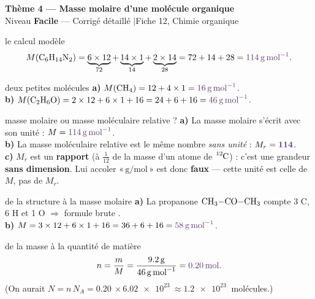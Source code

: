 \documentclass[11pt,a4paper]{article}
\newcommand{\rep}[1]{\textcolor{primarydark}{\textbf{#1}}}
\newcommand{\banner}[2]{%
\begin{tcolorbox}[enhanced,colback=excol,colframe=excol,arc=5pt,boxrule=0pt,
   left=5mm,right=5mm,top=2.5mm,bottom=2.5mm,coltext=white]
{\large\bfseries #1}\\[1pt]{\small #2}
\end{tcolorbox}\vspace{2pt}}
\begin{document}
\banner{Thème 4 — Masse molaire d'une molécule organique}{Niveau \textbf{Facile} — Corrigé détaillé \quad$\vert$\quad Fiche 12, Chimie organique}

\begin{corr}{le calcul modèle}
\[ M(\ce{C6H14N2}) = \underbrace{6\times12}_{72} + \underbrace{14\times1}_{14} + \underbrace{2\times14}_{28} = 72+14+28 = \rep{\qty{114}{\g\per\mol}}. \]
\end{corr}

\begin{corr}{deux petites molécules}
\textbf{a)} $M(\ce{CH4}) = 12 + 4\times1 = \rep{\qty{16}{\g\per\mol}}$.\\
\textbf{b)} $M(\ce{C2H6O}) = 2\times12 + 6\times1 + 16 = 24+6+16 = \rep{\qty{46}{\g\per\mol}}$.
\end{corr}

\begin{corr}{masse molaire ou masse moléculaire relative ?}
\textbf{a)} La masse molaire s'écrit avec son unité : $M = \rep{\qty{114}{\g\per\mol}}$.\\
\textbf{b)} La masse moléculaire relative est le même nombre \emph{sans unité} : $M_r = \rep{114}$.\\
\textbf{c)} $M_r$ est un \textbf{rapport} (à $\tfrac{1}{12}$ de la masse d'un atome de $\ce{^{12}C}$) : c'est une grandeur \rep{sans dimension}. Lui accoler «\,$\si{\g\per\mol}$\,» est donc \rep{faux} — cette unité est celle de $M$, pas de $M_r$.
\end{corr}

\begin{corr}{de la structure à la masse molaire}
\textbf{a)} La propanone $\ce{CH3-CO-CH3}$ compte 3 C, 6 H et 1 O $\Rightarrow$ formule brute \rep{}.\\
\textbf{b)} $M = 3\times12 + 6\times1 + 16 = 36+6+16 = \rep{\qty{58}{\g\per\mol}}$.
\end{corr}

\begin{corr}{de la masse à la quantité de matière}
\[ n = \frac{m}{M} = \frac{\qty{9,2}{\g}}{\qty{46}{\g\per\mol}} = \rep{\qty{0,20}{\mol}}. \]
(On aurait $N = n\,N_A = \qty{0,20}{}\times\qty{6,02e23}{} \approx \qty{1,2e23}{}$ molécules.)
\end{corr}
\end{document}
